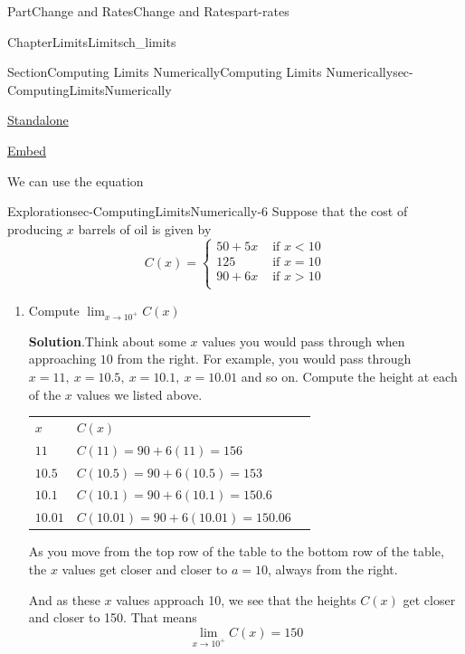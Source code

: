 \documentclass{tufte-book}
\newcommand{\blocktitlefont}{\relax}
\newcommand{\tabularfont}{\relax}
\numberwithin{equation}{chapter}
\newcommand{\hrulemedium}{\noalign{\hrule height 0.07em}}
\newcommand{\lt}{<}
\newcommand{\gt}{>}
\begin{document}
\begin{partptx}{Part}{Change and Rates}{}{Change and Rates}{}{}{part-rates}
\begin{chapterptx}{Chapter}{Limits}{}{Limits}{}{}{ch_limits}
\begin{sectionptx}{Section}{Computing Limits Numerically}{}{Computing Limits Numerically}{}{}{sec-ComputingLimitsNumerically}
\begin{sidebyside}{2}{0.075}{0.075}{0.17}
\begin{sbspanel}{0.21}
\href{http://webwork.bridgew.edu/oer/functions_at_work/sec-ComputingLimitsNumerically-4.html}{Standalone}%
\par
\href{http://webwork.bridgew.edu/oer/functions_at_work/sec-ComputingLimitsNumerically-4-if.html}{Embed}%
\end{sbspanel}%
\end{sidebyside}%
\par
We can use the equation%
\begin{exploration}{Exploration}{}{sec-ComputingLimitsNumerically-6}%
Suppose that the cost of producing \(x\) barrels of oil is given by%
\begin{equation*}
C(x) = 
\begin{cases}
50 + 5x & \text{ if } x\lt 10 \\ 
125     & \text{ if } x = 10 \\ 
90 + 6x & \text{ if } x\gt 10 \\ 
\end{cases}
\end{equation*}
%
\begin{enumerate}[font=\bfseries,label=(\alph*),ref=\alph*]%
\item{}Compute \(\displaystyle \lim_{x\rightarrow 10^+} C(x)\)%
\par\smallskip%
\noindent\textbf{\blocktitlefont Solution}.\hypertarget{sec-ComputingLimitsNumerically-6-2-2}{}\quad{}Think about some \(x\) values you would pass through when approaching \(10\) from the right. For example, you would pass through \(x=11,\ x=10.5,\ x=10.1,\ x=10.01\) and so on. Compute the height at each of the \(x\) values we listed above. \begin{center}%
{\tabularfont%
\begin{tabular}{lBl}
\(x\)&\(C(x)\)\tabularnewline\hrulemedium
\(11\)&\(C(11) =  90 + 6(11) = 156  \)\tabularnewline\hrulemedium
\(10.5\)&\(C(10.5) = 90 + 6(10.5) = 153  \)\tabularnewline\hrulemedium
\(10.1\)&\(C(10.1) =  90 + 6(10.1) =150.6  \)\tabularnewline\hrulemedium
\(10.01\)&\(C(10.01) = 90 + 6(10.01) =150.06   \)
\end{tabular}
}%
\end{center}%
 As you move from the top row of the table to the bottom row of the table, the \(x\) values get closer and closer to \(a=10\), always from the right.%
\par
And as these \(x\) values approach 10, we see that the heights \(C(x)\) get closer and closer to 150.  That means%
\begin{equation*}
\lim_{x\rightarrow 10^+} C(x) = 150

\end{equation*}
\end{enumerate}
\end{exploration}
\end{sectionptx}
\end{chapterptx}
\end{partptx}
\end{document}
